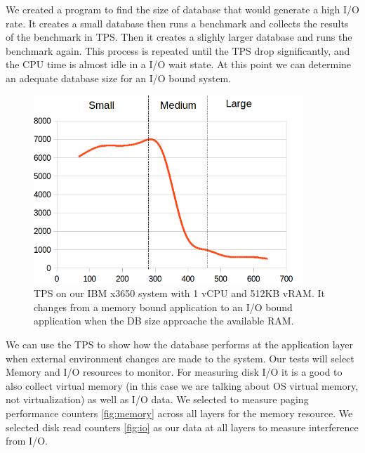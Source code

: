 We created a program to find the size of database that would generate a high I/O rate.  It creates a small database then runs a benchmark and collects the results of the benchmark in TPS.  Then it creates a slighly larger database and runs the benchmark again.  This process is repeated until the TPS drop significantly, and the CPU time is almost idle in a I/O wait state.  At this point we can determine an adequate database size for an I/O bound system.

\begin{figure}[!h]
  \begin{center}
  \includegraphics[width=4in]{images/SmallScale.png}
  \caption{TPS on our IBM x3650 system with 1 vCPU and 512KB vRAM. It changes from a memory bound application to an I/O bound application when the DB size approache the available RAM.}
  \label{smallIO}
  \end{center}
\end{figure}

We can use the TPS to show how the database performs at the application layer when external environment changes are made to the system.  Our tests will select Memory and I/O resources to monitor.  For measuring disk I/O it is a good to also collect virtual memory (in this case we are talking about OS virtual memory, not virtualization) as well as I/O data.  We selected to measure paging performance counters \ref{fig:memory} across all layers for the memory resource.  We selected disk read counters \ref{fig:io} as our data at all layers to measure interference from I/O. 

